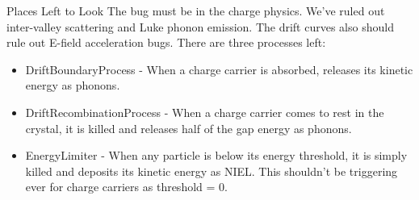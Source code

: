 \documentclass{beamer}
\begin{document}
\begin{frame}{Places Left to Look}
    \vfill
    The bug must be in the charge physics. We've ruled out inter-valley scattering
    and Luke phonon emission. The drift curves also should rule out E-field
    acceleration bugs. There are three processes left:
    \begin{itemize}
        \item DriftBoundaryProcess - When a charge carrier is absorbed, releases
            its kinetic energy as phonons.
        \item DriftRecombinationProcess - When a charge carrier comes to rest
            in the crystal, it is killed and releases half of the gap energy
            as phonons.
        \item EnergyLimiter - When any particle is below its energy threshold,
            it is simply killed and deposits its kinetic energy as NIEL. This
            shouldn't be triggering ever for charge carriers as threshold = 0.
    \end{itemize}
    \vfill
\end{frame}
\end{document}
